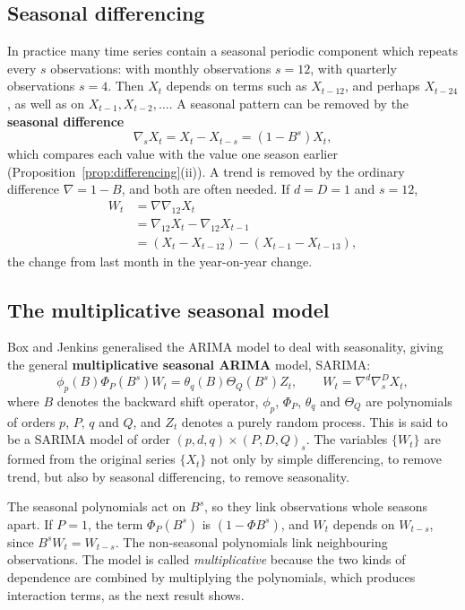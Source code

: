 \documentclass[11pt,a4paper]{article}
\theoremstyle{definition}
\begin{document}
\subsection{Seasonal differencing}
In practice many time series contain a seasonal periodic component which repeats every $s$ observations: with
monthly observations $s = 12$, with quarterly observations $s = 4$. Then $X_t$ depends on terms such as $X_{t-12}$, and perhaps
$X_{t-24}$, as well as on $X_{t-1}, X_{t-2}, \dots$. A seasonal pattern can be removed by the \textbf{seasonal difference}
\[
\nabla_sX_t = X_t - X_{t-s} = (1 - B^s)X_t ,
\]
which compares each value with the value one season earlier (Proposition~\ref{prop:differencing}(ii)). A trend is removed by the
ordinary difference $\nabla = 1 - B$, and both are often needed. If $d = D = 1$ and $s = 12$,
\begin{align*}
W_t &= \nabla\nabla_{12}X_t \\
&= \nabla_{12}X_t - \nabla_{12}X_{t-1} \\
&= (X_t - X_{t-12}) - (X_{t-1} - X_{t-13}) ,
\end{align*}
the change from last month in the year-on-year change.

\subsection{The multiplicative seasonal model}
Box and Jenkins generalised the ARIMA model to deal with seasonality, giving the general \textbf{multiplicative
seasonal ARIMA} model, SARIMA:
\[
\phi_p(B)\Phi_P(B^s)W_t = \theta_q(B)\Theta_Q(B^s)Z_t , \qquad W_t = \nabla^d\nabla_s^DX_t ,
\]
where $B$ denotes the backward shift operator, $\phi_p$, $\Phi_P$, $\theta_q$ and $\Theta_Q$ are polynomials of orders $p$, $P$, $q$ and $Q$, and $Z_t$ denotes a
purely random process. This is said to be a SARIMA model of order $(p, d, q) \times (P, D, Q)_s$. The variables $\{W_t\}$ are formed
from the original series $\{X_t\}$ not only by simple differencing, to remove trend, but also by seasonal differencing, to
remove seasonality.

The seasonal polynomials act on $B^s$, so they link observations whole seasons apart. If $P = 1$, the term $\Phi_P(B^s)$ is
$(1 - \Phi B^s)$, and $W_t$ depends on $W_{t-s}$, since $B^sW_t = W_{t-s}$. The non-seasonal polynomials link neighbouring observations. The
model is called \emph{multiplicative} because the two kinds of dependence are combined by multiplying the
polynomials, which produces interaction terms, as the next result shows.
\end{document}
